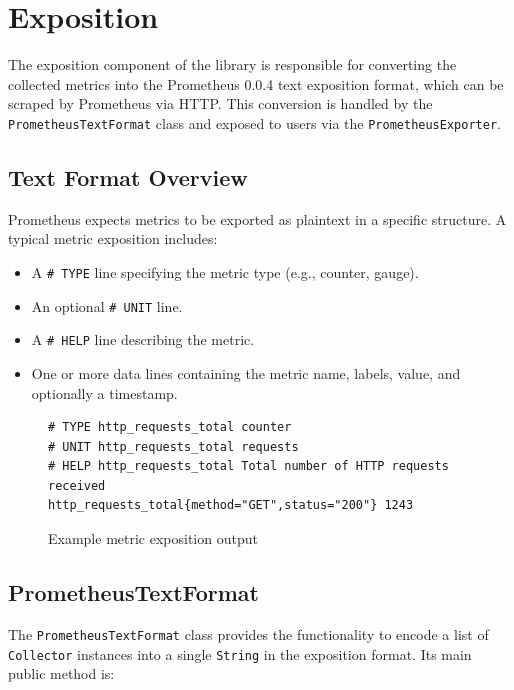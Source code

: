 \section{Exposition}\label{sec:exposition}

The exposition component of the library is responsible for converting the collected metrics into the Prometheus 0.0.4 text exposition format, which can be scraped by Prometheus via HTTP. This conversion is handled by the \texttt{PrometheusTextFormat} class and exposed to users via the \texttt{PrometheusExporter}.

\subsection{Text Format Overview}\label{subsec:text-format-overview}

Prometheus expects metrics to be exported as plaintext in a specific structure.
A typical metric exposition includes:

\begin{itemize}
    \item A \texttt{\# TYPE} line specifying the metric type (e.g., counter, gauge).
    \item An optional \texttt{\# UNIT} line.
    \item A \texttt{\# HELP} line describing the metric.
    \item One or more data lines containing the metric name, labels, value, and optionally a timestamp.
\end{itemize}

\begin{figure}[h]
    \begin{lstlisting}
# TYPE http_requests_total counter
# UNIT http_requests_total requests
# HELP http_requests_total Total number of HTTP requests received
http_requests_total{method="GET",status="200"} 1243
    \end{lstlisting}
    \caption{Example metric exposition output}
\end{figure}

\subsection{PrometheusTextFormat}\label{subsec:prometheustextformat}

The \texttt{PrometheusTextFormat} class provides the functionality to encode a list of \texttt{Collector} instances into a single \texttt{String} in the exposition format.
Its main public method is:

